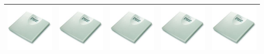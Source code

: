 \documentclass[11pt,titlepage]{article}
\begin{document}
\begin{tabular}{| m{80 pt} | m{80 pt} | m{80 pt} | m{80 pt} | m{80 pt} |}\hline
  \includegraphics[scale=0.40,bb=0 0 150 150]{prod_bs1.jpg} & 
  \includegraphics[scale=0.40,bb=0 0 150 150]{prod_bs2.jpg} & 
  \includegraphics[scale=0.40,bb=0 0 150 150]{prod_bs3.jpg} & 
  \includegraphics[scale=0.40,bb=0 0 150 150]{prod_bs4.jpg} & 
  \includegraphics[scale=0.40,bb=0 0 150 150]{prod_bs5.jpg} \\\hline

\end{tabular}
\end{document}
